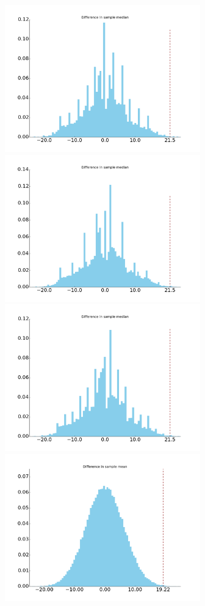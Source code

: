 \documentclass[11pt]{article}
\begin{document}
  \begin{centering}
 \includegraphics[height =2.5in]{figure_2}\includegraphics[height =2.5in]{figure_4}\\ \includegraphics[height =2.5in]{figure_6}\includegraphics[height =2.5in]{figure_1}\\

\end{centering}
\end{document}
